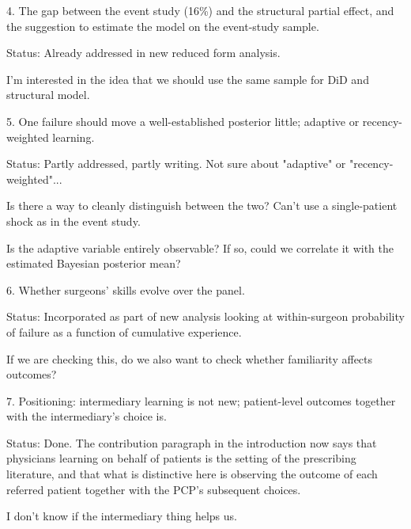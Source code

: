 \documentclass[11pt]{article}
\newcommand{\status}[1]{\par\noindent Status: #1\par\medskip\noindent{\color{gray!40}\hrulefill}\par\medskip}
\begin{document}
4. The gap between the event study (16\%) and the structural partial effect, and the suggestion to estimate the model on the event-study sample. \status{Already addressed in new reduced form analysis.}

I'm interested in the idea that we should use the same sample for DiD and structural model.

5. One failure should move a well-established posterior little; adaptive or recency-weighted learning. \status{Partly addressed, partly writing. Not sure about "adaptive" or "recency-weighted"...}

Is there a way to cleanly distinguish between the two? Can't use a single-patient shock as in the event study.

Is the adaptive variable entirely observable? If so, could we correlate it with the estimated Bayesian posterior mean?

6. Whether surgeons' skills evolve over the panel. \status{Incorporated as part of new analysis looking at within-surgeon probability of failure as a function of cumulative experience.}

If we are checking this, do we also want to check whether familiarity affects outcomes?

7. Positioning: intermediary learning is not new; patient-level outcomes together with the intermediary's choice is. \status{Done. The contribution paragraph in the introduction now says that physicians learning on behalf of patients is the setting of the prescribing literature, and that what is distinctive here is observing the outcome of each referred patient together with the PCP's subsequent choices.}

I don't know if the intermediary thing helps us.
\end{document}
